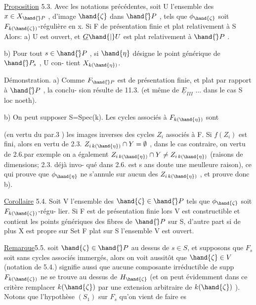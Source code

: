 
\uline{Proposition} 5.3.   Avec les notations précédentes, soit U l'ensemble des
$x\in X_{\hand{\check{}}P}$ , d'image $\hand{\zeta}$ dans $\hand{\check{}}P$ , tels que $\phi_{\hand{\zeta}}$ soit $F_{k(\hand{\zeta})}$-régulière en x.  Si F de présentation finie et plat relativement à S\hand{,} Alors:
a) U est ouvert, et $\underline{G}\hand{|}U$ est plat relativement à $\hand{\check{}}P$ .

b) Pour tout $s\in\hand{\check{}}P$ , si $\hand{\eta}$ désigne le point générique de $\hand{\check{}}P_s$ , U con-%
tient $X_{k(\hand{\eta})}$.

Démonstration. a) Comme $F_{\hand{\check{}}P}$ est de présentation finie, et plat par rapport à $\hand{\check{}}P$ , la conclu-%
sion résulte de 11.3. (et même de $\underline{E}_{III}$ ... dans le cas S loc noeth).

b) On peut supposer S=Spec(k). Les cycles associés à $F_{k(\hand{\eta})}$ sont

(en vertu du par.3 ) les images inverses des cycles $Z_i$ associés à F.  Si $f(Z_i)$ est fini, alors en vertu de 2.3. 
$Z_{i\,k(\hand{\eta})}\cap Y = \emptyset$ , dans le cas contraire, on vertu de 2.6.par exemple on a
également $Z_{i\,k(\hand{\eta})}\cap Y \neq Z_{i\,k(\hand{\eta})}$ (raisons de dimensions; 2.3. déjà invo-%
qué dans 2.6. est s ans doute une meulleure raison), ce qui prouve que $\phi_{\hand{\eta}}$
ne s'annule sur aucun des $Z_{i\,k(\hand{\eta})}$ , et prouve donc b).

\uline{Corollaire} 5.4. Soit V l'ensemble des $\hand{\zeta}\in\hand{\check{}}P$ tels que $\phi_{\hand{\zeta}}$ soit  $F_{k(\hand{\zeta})}$-régu-%
lier. Si F est de présentation finie lors V est constructible et contient les points génériques des
fibres de $\hand{\check{}}P$ sur S, d'autre part si de plus X est propre sur Set F plat sur S\hand{,} l'ensemble V est
ouvert. 

\uline{Remarque}5.5.  soit $\hand{\zeta}\in\hand{\check{}}P$ au dessus de $s\in S$, et supposons
que $F_s$ soit sans cycles associés immergés, alors on voit aussitôt que
$\hand{\zeta}\in V$ (notation de 5.4.) signifie aussi que aucune composante
irréductible de supp $F_{k(\hand{\zeta})}$ ne se trouve au dessus de $H_{\hand{\zeta}}$ (et on peut
évidemment dans ce critère remplacer $k(\hand{\zeta})$ par une extension arbitraire
de $k(\hand{\zeta})$ ). Notons que l'hypothèse $(S_1)$ sur $F_s$ qu'on vient de faire es


